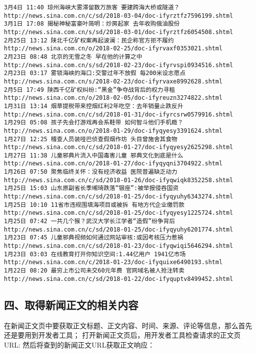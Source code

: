 \documentclass[11pt]{article}
\begin{document}
\begin{Verbatim}[commandchars=\\\{\}]
3月4日 11:40 琼州海峡大雾滞留数万旅客 要建跨海大桥或隧道？ http://news.sina.com.cn/c/sd/2018-03-04/doc-ifyrztfz7596199.shtml
3月1日 17:08 揭秘神秘富豪叶简明：炒房起家 去年收购俄油股份 http://news.sina.com.cn/s/sd/2018-03-01/doc-ifyrztfz6054508.shtml
2月25日 13:12 陕北千亿矿权案再起波澜：民企称官方拒不履约 http://news.sina.com.cn/o/2018-02-25/doc-ifyrvaxf0353021.shtml
2月23日 08:48 北京的无雪之冬 早在他的计算之中 http://news.sina.com.cn/s/sd/2018-02-23/doc-ifyrvspi0934516.shtml
2月23日 03:17 雾锁海峡的海口:交警过年不放假 每200米设志愿点 http://news.sina.com.cn/s/2018-02-23/doc-ifyrvaxe8992628.shtml
2月5日 17:49 陕西千亿矿权纠纷:“黑金”争夺战背后的权力寻租 http://news.sina.com.cn/o/2018-02-05/doc-ifyreuzn3274822.shtml
1月31日 13:14 烟草提税带来控烟红利2年吃空：去年销量止跌反升 http://news.sina.com.cn/c/sd/2018-01-31/doc-ifyrcsrw0579916.shtml
1月29日 05:08 孩子先会打游戏再会系鞋带 如何智斗他们手机瘾？ http://news.sina.com.cn/o/2018-01-29/doc-ifyqyesy3391624.shtml
1月27日 12:25 稽查人员装哑巴侦查假烟作坊 头目曾施舍其食物 http://news.sina.com.cn/c/sd/2018-01-27/doc-ifyqyesy2625298.shtml
1月27日 11:38 儿童邪典片流入中国毒害儿童 邪典文化到底是什么 http://news.sina.com.cn/o/2018-01-27/doc-ifyqyqni3704922.shtml
1月26日 07:50 聚焦临终关怀：没有经济收益 医院普遍缺乏动力 http://news.sina.com.cn/c/sd/2018-01-26/doc-ifyqwiqk8352258.shtml
1月25日 15:03 山东原副省长季缃琦跌落“银座”:被举报侵吞国资 http://news.sina.com.cn/c/sd/2018-01-25/doc-ifyqyuhy6343274.shtml
1月25日 10:10 11省市违规围填海项目或被拆 有地方代企业缴罚款 http://news.sina.com.cn/c/sd/2018-01-25/doc-ifyqyesy1225724.shtml
1月25日 07:42 一共几个猴？武汉大学长江学者“造假”纷争背后 http://news.sina.com.cn/c/sd/2018-01-25/doc-ifyqyuhy6201774.shtml
1月23日 07:45 儿童邪典视频如何通过网站审核:或因考核压力惹祸 http://news.sina.com.cn/c/sd/2018-01-23/doc-ifyqwiqi5646294.shtml
1月23日 03:03 在线教育打开你知识空间:1.44亿用户 1941亿市场 http://news.sina.com.cn/c/2018-01-23/doc-ifyquixe6490193.shtml
1月22日 08:20 最穷上市公司未交60元年费 官网域名被人抢注转卖 http://news.sina.com.cn/c/sd/2018-01-22/doc-ifyquptv8499452.shtml

    \end{Verbatim}

    \subsection{四、取得新闻正文的相关内容}\label{ux56dbux53d6ux5f97ux65b0ux95fbux6b63ux6587ux7684ux76f8ux5173ux5185ux5bb9}

    在新闻正文页中要获取正文标题、正文内容、时间、来源、评论等信息，那么首先还是要用到开发者工具；
打开新闻正文页后，用开发者工具检查请求的正文页URL:
然后将查到的新闻正文URL获取正文响应：
\end{document}

